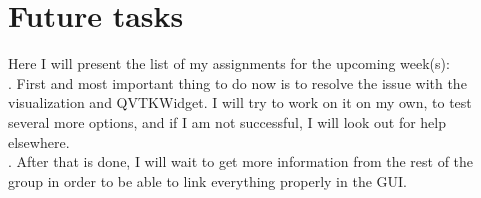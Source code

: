 \documentclass[aps,letterpaper,11pt]{revtex4}
\begin{document}
\section {Future tasks}
Here I will present the list of my assignments for the upcoming week(s):\\
. First and most important thing to do now is to resolve the issue with the visualization and QVTKWidget. I will try to work on it on my own, to test several more options, and if I am not successful, 
I will look out for help elsewhere.\\
. After that is done, I will wait to get more information from the rest of the group in order to be able to link everything properly in the GUI. \\
\end{document}
